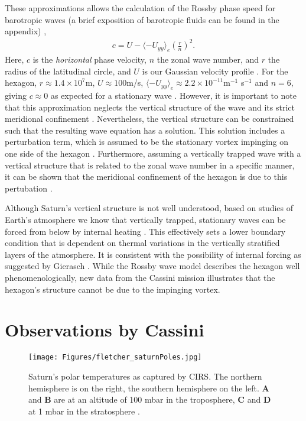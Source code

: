 \documentclass[preprint]{revtex4-1} %
\begin{document}
These approximations allows the calculation of the Rossby phase speed
for barotropic waves (a brief exposition of barotropic fluids can be
found in the appendix) \cite{Allison1990},
\begin{align} 
  \label{eq:rossbyDispersion}
  c = U - \langle -U_{yy} \rangle_e \left(\frac{r}{n}\right)^2.
\end{align}
Here, $c$ is the \textit{horizontal} phase velocity, $n$ the zonal
wave number, and $r$ the radius of the latitudinal circle, and $U$ is
our Gaussian velocity profile \cite{Allison1990}.  For the hexagon,
$r\approx 1.4 \times 10^7$m, $U\approx 100$m/s, $\langle -U_{yy}
\rangle_e \approx 2.2 \times 10^{-11}$m$^{-1}$ s$^{-1}$ and $n=6$,
giving $c \approx 0$ as expected for a stationary wave
\cite{Allison1990}.  However, it is important to note that this
approximation neglects the vertical structure of the wave and its
strict meridional confinement \cite{Allison1990}.  Nevertheless, the
vertical structure can be constrained such that the resulting wave
equation has a solution.
This solution includes a perturbation term, which is assumed to be the
stationary vortex impinging on one side of the hexagon
\cite{Allison1990}.  Furthermore, assuming a
vertically trapped wave with a vertical structure that is
related to the zonal wave number in a specific manner, it can be shown
that the meridional 
confinement of the hexagon is due to this pertubation \cite{Allison1990}.

Although Saturn's vertical structure is not well understood, based on
studies of Earth's 
atmosphere we know that vertically trapped, stationary waves can be
forced from below by 
internal heating \cite{Allison1990}.  This
effectively sets a lower boundary condition that is dependent on thermal variations
in the vertically stratified layers of the atmosphere.  It is
consistent with the possibility of internal forcing as suggested by
Gierasch \cite{Gierasch1989}.  While the Rossby wave model describes
the hexagon well phenomenologically, new data from the Cassini mission
illustrates that the hexagon's structure cannot be due to the
impinging vortex.

\section{Observations by Cassini}
\label{sec:cassini}
\begin{figure}
  \centering
  \texttt{[image: Figures/fletcher\_saturnPoles.jpg]}
  \caption{Saturn's polar temperatures as captured by CIRS.  The
    northern hemisphere is on the 
    right, the southern hemisphere on the left.  \textbf{A} and
    \textbf{B} are at an altitude of 100 mbar in the troposphere,
    \textbf{C} and \textbf{D} at 1 mbar in the stratosphere
    \cite[fig~1]{Fletcher2008}.}
  \label{fig:saturnPoles}
\end{figure}
\end{document}
